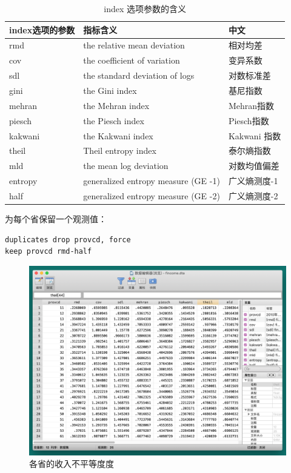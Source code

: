 \begin{table}[htbp]
  \centering
  \caption{\label{tab:egenindex} index 选项参数的含义}
  \begin{tabular}{lll}
    \toprule
    index选项的参数 & 指标含义 & 中文 \\
    \midrule
    rmd & the relative mean deviation & 相对均差 \\
    cov & the coefficient of variation & 变异系数 \\
    sdl & the standard deviation of logs & 对数标准差 \\
    gini & the Gini index & 基尼指数 \\
    mehran & the Mehran index & Mehran指数 \\
    piesch & the Piesch index & Piesch指数 \\
    kakwani & the Kakwani index & Kakwani 指数 \\
    theil & Theil entropy index & 泰尔熵指数 \\
    mld & the mean log deviation & 对数均值偏差 \\
    entropy & generalized entropy measure (GE -1) & 广义熵测度-1 \\
    half & generalized entropy measure (GE -2) & 广义熵测度-2 \\
    \bottomrule
  \end{tabular}
\end{table}

为每个省保留一个观测值：

\begin{lstlisting}
duplicates drop provcd, force
keep provcd rmd-half
\end{lstlisting}

\begin{figure}[htbp]
 \centering
 \includegraphics[width=\textwidth]{assets/gini.png}
 \caption{各省的收入不平等度度}\label{fig:gini}
\end{figure}
